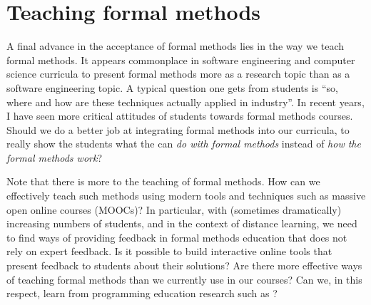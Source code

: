 \documentclass[sigplan]{acmart}\settopmatter{printfolios=true,printccs=false,printacmref=false}
\begin{document}
\section{Teaching formal methods}

A final advance in the acceptance of formal methods lies in the way we teach
formal methods. It appears commonplace in software engineering and computer
science curricula to present formal methods more as a research topic than as a
software engineering topic. A typical question one gets from students is ``so,
where and how are these techniques actually applied in industry''. In recent
years, I have seen more critical attitudes of students towards formal methods
courses. Should we do a better job at integrating formal methods into our
curricula, to really show the students what the can \emph{do with formal methods}
instead of \emph{how the formal methods work}?

Note that there is more to the teaching of formal methods. How can we
effectively teach such methods using modern tools and techniques such as massive
open online courses (MOOCs)? In particular, with (sometimes dramatically)
increasing numbers of students, and in the context of distance learning, we need
to find ways of providing feedback in formal methods education that does not
rely on expert feedback. Is it possible to build interactive online tools that
present feedback to students about their solutions? Are there more effective
ways of teaching formal methods than we currently use in our courses? Can we, in
this respect, learn from programming education research such as \cite{scratch,redesign}?



\end{document}
